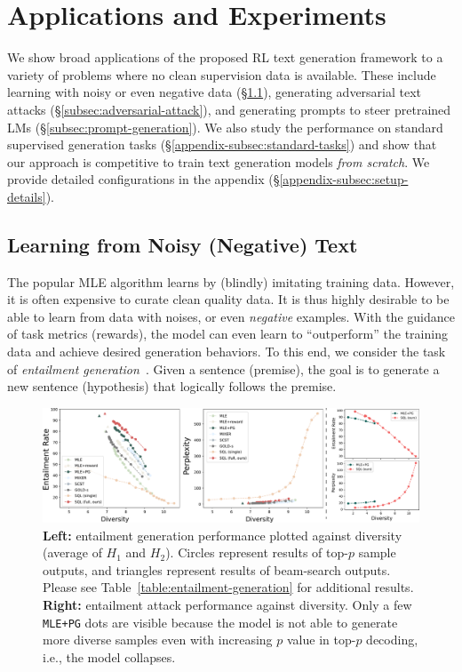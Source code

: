
\section{Applications and Experiments}


We show broad applications of the proposed RL text generation framework to a variety of problems where no clean supervision data is available. These include learning with noisy or even negative data (\S\ref{subsec:noisy-data}), generating adversarial text attacks (\S\ref{subsec:adversarial-attack}), and generating prompts to steer pretrained LMs (\S\ref{subsec:prompt-generation}).
We also study the performance on standard supervised generation tasks (\S\ref{appendix-subsec:standard-tasks}) and show that our approach is competitive to train text generation models \emph{from scratch}. We provide detailed configurations in the appendix (\S\ref{appendix-subsec:setup-details}).

\subsection{Learning from Noisy (Negative) Text}
\label{subsec:noisy-data}

The popular MLE algorithm learns by (blindly) imitating training data.
However,
it is often expensive to curate clean quality data. It is thus highly desirable to be able to learn from data with noises, or even \emph{negative} examples.
With the guidance of task metrics (rewards), the model can even learn to ``outperform'' the training data and achieve desired generation behaviors.
To this end, we consider the task of \emph{entailment generation}~\citep{pasunuru2017multi}. Given a sentence (premise), the goal is to generate a new sentence (hypothesis) that logically follows the premise. 



\begin{figure}
    \centering
    \includegraphics[width=0.99\linewidth]{figures/202101005-entailment-combined.pdf}
    \vspace{-7pt}
    \caption{
    \textbf{Left:} entailment generation performance plotted against diversity (average of $H_1$ and $H_2$). 
    Circles represent results of top-$p$ sample outputs,
    and triangles represent results of beam-search outputs.
    Please see Table~\ref{table:entailment-generation} for additional results.
    \textbf{Right:} entailment attack performance against diversity. 
    Only a few \texttt{MLE+PG} dots are visible because the model is not able to generate more diverse samples even with increasing $p$ value in top-$p$ decoding, i.e., the model collapses.
    }
    \label{fig:entailment-generation}
    \label{fig:entailment-attack}
    \vspace{-5pt}
\end{figure}


